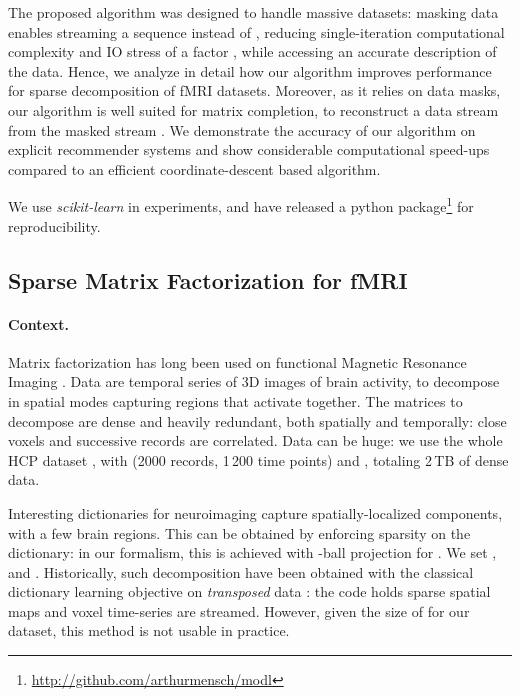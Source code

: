 \documentclass{article}
\begin{document}
The proposed algorithm was designed to handle massive datasets:
masking data enables streaming a sequence  instead of
, reducing single-iteration computational complexity and IO stress of a factor ,
while accessing an accurate description of the data. Hence, we analyze in
detail how our algorithm improves performance for
sparse decomposition of fMRI datasets. Moreover, as it relies on data
masks, our algorithm is well suited for matrix completion,
to reconstruct a data stream  from the masked stream
.
We demonstrate the accuracy of our algorithm on explicit
recommender systems and show considerable computational speed-ups
compared to an efficient coordinate-descent based algorithm.

We use \textit{scikit-learn} \cite{pedregosa_scikit-learn:_2011} in experiments,
and have released a python package\footnote{\url{http://github.com/arthurmensch/modl}} for reproducibility.

\subsection{Sparse Matrix Factorization for fMRI}


\paragraph{Context.}Matrix factorization has long been used on
functional Magnetic Resonance Imaging \cite{mckeown_analysis_1998}. Data are
temporal series of 3D images of brain activity, to decompose in spatial modes
capturing regions that activate together. The matrices to decompose are dense
and heavily redundant, both spatially and temporally: close voxels and
successive records are correlated. Data can be huge:
we use the whole HCP dataset \cite{van_essen_wu-minn_2013}, with  (2000 records, 1\,200 time points) and , totaling 2\,TB of dense
data.

Interesting dictionaries for neuroimaging capture spatially-localized
components, with a few brain regions. This can be obtained by enforcing
sparsity on the dictionary: in our formalism, this is achieved with
-ball
projection for . We set , and . Historically, such decomposition have been obtained
with the classical
dictionary learning objective on \textit{transposed} data
\cite{varoquaux_cohort-level_2013}: the code  holds sparse spatial
maps and voxel time-series are streamed. However, given the size of  for our
dataset, this method is not usable in practice.
\end{document}
